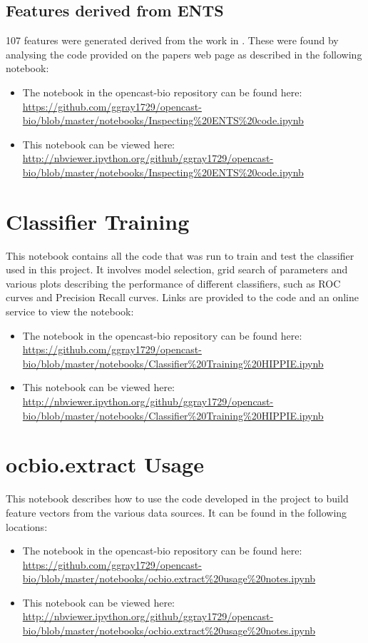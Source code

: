 \subsection{Features derived from ENTS}

107 features were generated derived from the work in \textcite{rodgers-melnick_predicting_2013}.
These were found by analysing the code provided on the papers web page as described in the following notebook:

\begin{itemize}
    \item The notebook in the opencast-bio repository can be found here: \url{https://github.com/ggray1729/opencast-bio/blob/master/notebooks/Inspecting%20ENTS%20code.ipynb}
        \item This notebook can be viewed here: \url{http://nbviewer.ipython.org/github/ggray1729/opencast-bio/blob/master/notebooks/Inspecting%20ENTS%20code.ipynb}
\end{itemize}

\section{Classifier Training}
\label{app:classtrain}

This notebook contains all the code that was run to train and test the classifier used in this project.
It involves model selection, grid search of parameters and various plots describing the performance of different classifiers, such as ROC curves and Precision Recall curves.
Links are provided to the code and an online service to view the notebook:

\begin{itemize}
    \item The notebook in the opencast-bio repository can be found here: \url{https://github.com/ggray1729/opencast-bio/blob/master/notebooks/Classifier%20Training%20HIPPIE.ipynb}
    \item This notebook can be viewed here: \url{http://nbviewer.ipython.org/github/ggray1729/opencast-bio/blob/master/notebooks/Classifier%20Training%20HIPPIE.ipynb}
\end{itemize}

\section{ocbio.extract Usage}
\label{app:ocbio}

This notebook describes how to use the code developed in the project to build feature vectors from the various data sources.
It can be found in the following locations:

\begin{itemize}
    \item The notebook in the opencast-bio repository can be found here: \url{https://github.com/ggray1729/opencast-bio/blob/master/notebooks/ocbio.extract%20usage%20notes.ipynb}
    \item This notebook can be viewed here: \url{http://nbviewer.ipython.org/github/ggray1729/opencast-bio/blob/master/notebooks/ocbio.extract%20usage%20notes.ipynb}
\end{itemize}

